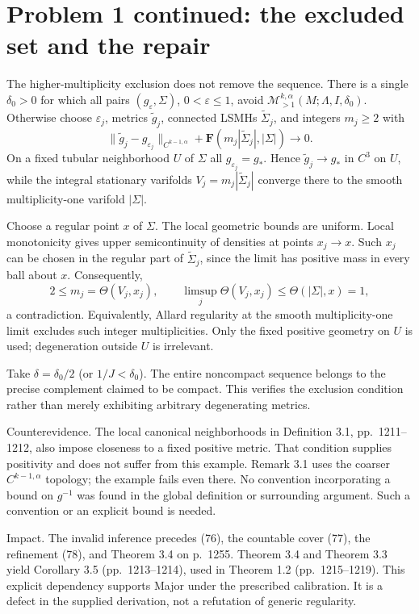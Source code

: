 \documentclass[10pt]{article}
\begin{document}
\section*{Problem 1 continued: the excluded set and the repair}
The higher-multiplicity exclusion does not remove the sequence. There is a single \(\delta_0>0\) for which all pairs \((g_\varepsilon,\Sigma)\), \(0<\varepsilon\leq1\), avoid \(\mathcal M_{>1}^{k,\alpha}(M;\Lambda,I,\delta_0)\). Otherwise choose \(\varepsilon_j\), metrics \(\widetilde g_j\), connected LSMHs \(\widetilde\Sigma_j\), and integers \(m_j\geq2\) with \[\|\widetilde g_j-g_{\varepsilon_j}\|_{C^{k-1,\alpha}}
       +\mathbf F(m_j|\widetilde\Sigma_j|,|\Sigma|)\longrightarrow0.\] On a fixed tubular neighborhood \(U\) of \(\Sigma\) all \(g_{\varepsilon_j}=g_*\). Hence \(\widetilde g_j\to g_*\) in \(C^3\) on \(U\), while the integral stationary varifolds \(V_j=m_j|\widetilde\Sigma_j|\) converge there to the smooth multiplicity-one varifold \(|\Sigma|\).\par
Choose a regular point \(x\) of \(\Sigma\). The local geometric bounds are uniform. Local monotonicity gives upper semicontinuity of densities at points \(x_j\to x\). Such \(x_j\) can be chosen in the regular part of \(\widetilde\Sigma_j\), since the limit has positive mass in every ball about \(x\). Consequently, \[2\leq m_j=\Theta(V_j,x_j),\qquad
 \limsup_j\Theta(V_j,x_j)\leq\Theta(|\Sigma|,x)=1,\] a contradiction. Equivalently, Allard regularity at the smooth multiplicity-one limit excludes such integer multiplicities. Only the fixed positive geometry on \(U\) is used; degeneration outside \(U\) is irrelevant.\par
Take \(\delta=\delta_0/2\) (or \(1/J<\delta_0\)). The entire noncompact sequence belongs to the precise complement claimed to be compact. This verifies the exclusion condition rather than merely exhibiting arbitrary degenerating metrics.\par
Counterevidence. The local canonical neighborhoods in Definition 3.1, pp. 1211–1212, also impose closeness to a fixed positive metric. That condition supplies positivity and does not suffer from this example. Remark 3.1 uses the coarser \(C^{k-1,\alpha}\) topology; the example fails even there. No convention incorporating a bound on \(g^{-1}\) was found in the global definition or surrounding argument. Such a convention or an explicit bound is needed.\par
Impact. The invalid inference precedes (76), the countable cover (77), the refinement (78), and Theorem 3.4 on p. 1255. Theorem 3.4 and Theorem 3.3 yield Corollary 3.5 (pp. 1213–1214), used in Theorem 1.2 (pp. 1215–1219). This explicit dependency supports Major under the prescribed calibration. It is a defect in the supplied derivation, not a refutation of generic regularity.\par
\end{document}
